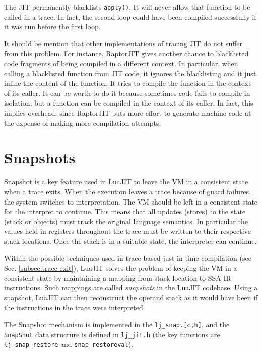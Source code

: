 \noindent
The JIT permanently blacklists \texttt{apply()}. It will never allow that function to be called in a trace. In fact, the second loop could have been compiled successfully if it was run before the first loop.

It should be mention that other implementations of tracing JIT do not suffer from this problem. For instance, RaptorJIT \cite{gorrie2017raptorjit} gives another chance to blacklisted code fragments of being compiled in a different context. In particular, when calling a blacklisted function from JIT code, it ignores the blacklisting and it just inline the content of the function. It tries to compile the function in the context of its caller. It can be worth to do it because sometimes code fails to compile in isolation, but a function can be compiled in the context of its caller. In fact, this implies overhead, since RaptorJIT puts more effort to generate machine code at the expense of making more compilation attempts.

\section{Snapshots}
\label{sec:snapshots}
Snapshot is a key feature used in LuaJIT to leave the VM in a consistent state when a trace exits. When the execution leaves a trace because of guard failures, the system switches to interpretation. The VM should be left in a consistent state for the interpret to continue. This means that all updates (stores) to the state (stack or objects) must track the original language semantics. In particular the values held in registers throughout the trace must be written to their respective stack locations. Once the stack is in a suitable state, the interpreter can continue.

Within the possible techniques used in trace-based just-in-time compilation (see Sec. \ref{subsec:trace-exit}), LuaJIT solves the problem of keeping the VM in a consistent state by maintaining a mapping from stack location to SSA IR instructions. Such mappings are called \textit{snapshots} in the LuaJIT codebase. Using a snapshot, LuaJIT can then reconstruct the operand stack as it would have been if the instructions in the trace were interpreted.

The Snapshot mechanism is implemented in the \texttt{lj\_snap.[c,h]}, and the \texttt{SnapShot} data structure is defined in \texttt{lj\_jit.h} (the key functions are \texttt{lj\_snap\_restore} and \texttt{snap\_restoreval}).

